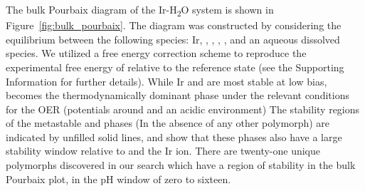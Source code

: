 %
%
The bulk Pourbaix diagram of the Ir-H\textsubscript{2}O system is shown in Figure~\ref{fig:bulk_pourbaix}.
%
The diagram was constructed by considering the equilibrium between the following species: Ir, \rIrOtwo, \aIrOthree, \rIrOthree, \bIrOthree, and an aqueous dissolved  species.
%
We utilized a free energy correction scheme to reproduce the experimental free energy of \IrOtwo relative to the  reference state
(see the Supporting Information for further details).
%
While Ir and \rIrOtwo are most stable at low bias, \aIrOthree becomes the thermodynamically dominant phase under the relevant conditions for the OER (potentials around  \VRHE and an acidic environment)
%
The stability regions of the metastable \rIrOthree and \bIrOthree phases (In the absence of any other \IrOthree polymorph) are indicated by unfilled solid lines, and show that these phases also have a large stability window relative to \IrOtwo and the Ir ion.
%
There are twenty-one unique \IrOthree polymorphs discovered in our search which have a region of stability in the bulk Pourbaix plot, in the pH window of zero to sixteen.
%


